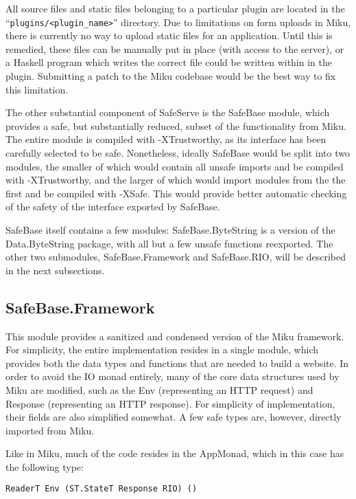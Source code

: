 \documentclass[12pt]{article}
\begin{document}
All source files and static files belonging to a particular plugin are
located in the ``\verb+plugins/<plugin_name>+'' directory.  Due to limitations on form
uploads in Miku, there is currently no way to upload static files for an application.
Until this is remedied, these files can be manually put in place (with access to the
server), or a Haskell program which writes the correct file could be written within in the plugin.
Submitting a patch to the Miku codebase would be the best way to fix this limitation.


The other substantial component of SafeServe is the SafeBase module, which provides
a safe, but substantially reduced, subset of the functionality from Miku.  The
entire module is compiled with -XTrustworthy, as its interface has been carefully
selected to be safe.  Nonetheless, ideally SafeBase would be split into two modules,
the smaller of which would contain all unsafe imports and be compiled with -XTrustworthy,
and the larger of which would import modules from the the first and be compiled with
-XSafe.  This would provide better automatic checking of the safety of the interface
exported by SafeBase.

SafeBase itself contains a few modules: SafeBase.ByteString is a version of the Data.ByteString
package, with all but a few unsafe functions reexported.  The other two submodules,
SafeBase.Framework and SafeBase.RIO, will be described in the next subsections.

\subsection{SafeBase.Framework}
This module provides a sanitized and condensed version of the Miku framework.  For simplicity,
the entire implementation resides in a single module, which provides both the data types and
functions that are needed to build a website.  In order to avoid the IO monad entirely,
many of the core data structures used by Miku are modified, such as the Env (representing an
HTTP request) and Response (representing an HTTP response).  For simplicity of implementation,
their fields are also simplified somewhat.  A few safe types are, however, directly
imported from Miku.

Like in Miku, much of the code resides in the AppMonad, which in this case has the following type:

\begin{verbatim}
ReaderT Env (ST.StateT Response RIO) ()
\end{verbatim}
\end{document}
